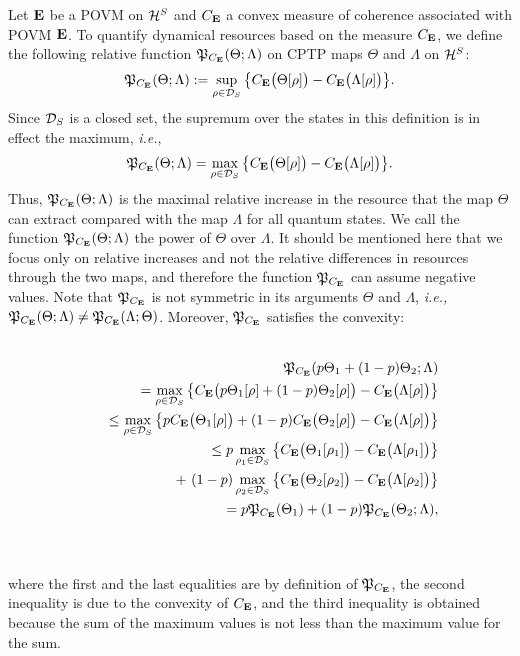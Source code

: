 \documentclass[american,aps,pra,reprint, superscriptaddress]{revtex4-1}
\def\be{\begin{equation}}
\def\ee{\end{equation}}
\def\bea{\begin{eqnarray*}}
\def\eea{\end{eqnarray*}}
\theoremstyle{plain}
\theoremstyle{definition}
\theoremstyle{remark}
\begin{document}
Let $\mathbf{E}$ be a POVM on $\mathcal{H}^{S}$ and $C_{\mathbf{E}}$ a convex measure of coherence associated with POVM $\mathbf{E}$. To quantify dynamical resources based on the measure $C_{\mathbf{E}}$, we define the following relative function $\mathfrak{P}_{C_{\mathbf{E}}}(\Theta;\Lambda)$ on CPTP maps $\Theta$ and $\Lambda$ on $\mathcal{H}^{S}$:
\be\label{eq:5}
\fP_{C_\bE}(\Theta;\Lambda) := \sup_{\rho\in\cD_S}\big\{C_\bE\big(\Theta[\rho]\big)-C_\bE\big(\Lambda[\rho]\big)\big\}.
\ee
Since $\mathcal{D}_S$ is a closed set, the supremum over the states in this definition is in effect the maximum, \emph{i.e.},
\bea
\fP_{C_\bE}(\Theta;\Lambda) = \max_{\rho\in\cD_S}\big\{C_\bE\big(\Theta[\rho]\big)-C_\bE\big(\Lambda[\rho]\big)\big\}.
\eea
Thus, $\mathfrak{P}_{C_{\mathbf{E}}}(\Theta;\Lambda)$ is the maximal relative increase in the resource that the map $\Theta$ can extract compared with the map $\Lambda$ for all quantum states. We call the function $\mathfrak{P}_{C_{\mathbf{E}}}(\Theta;\Lambda)$ the power of $\Theta$ over $\Lambda$. It should be mentioned here that we focus only on relative increases and not the relative differences in resources through the two maps, and therefore the function $\mathfrak{P}_{C_{\mathbf{E}}}$ can assume negative values.
Note that $\mathfrak{P}_{C_{\mathbf{E}}}$ is not symmetric in its arguments $\Theta$ and $\Lambda$, \emph{i.e.,} $\mathfrak{P}_{C_{\mathbf{E}}}(\Theta;\Lambda)\neq \mathfrak{P}_{C_{\mathbf{E}}}(\Lambda;\Theta)$.
Moreover, $\mathfrak{P}_{C_{\mathbf{E}}}$ satisfies the convexity:\\
\\
\parbox{6.2cm}{
\begin{eqnarray*}
&&\fP_{C_\bE}(p\Theta_1+(1-p)\Theta_2;\Lambda)\\
&&\quad =  \max_{\rho\in\cD_S}\big\{C_\bE\big(p\Theta_1[\rho]+(1-p)\Theta_2[\rho]\big)-C_\bE\big(\Lambda[\rho]\big)\big\}\\
&&\quad \leq \max_{\rho\in\cD_S}\big\{pC_\bE\big(\Theta_1[\rho]\big)+(1-p)C_\bE\big(\Theta_2[\rho]\big)-C_\bE\big(\Lambda[\rho]\big)\big\}\\
&&\quad \leq p\max_{\rho_1\in\cD_S}\big\{C_\bE\big(\Theta_1[\rho_1]\big)-C_\bE\big(\Lambda[\rho_1]\big)\big\}\\
&&\qquad +\ (1-p)\max_{\rho_2\in\cD_S}\big\{C_\bE\big(\Theta_2[\rho_2]\big)-C_\bE\big(\Lambda[\rho_2]\big)\big\}\\
&&\quad =p\fP_{C_\bE}(\Theta_1) + (1-p)\fP_{C_\bE}(\Theta_2;\Lambda),
\end{eqnarray*}}\hfill
\parbox{.3cm}{\begin{eqnarray}\label{eq:the convexity of power}\end{eqnarray}}\\
where the first and the last equalities are by definition of $\mathfrak{P}_{C_{\mathbf{E}}}$, the second inequality is due to the convexity of $C_{\mathbf{E}}$, and the third inequality is obtained because the sum of the maximum values is not less than the maximum value for the sum.
\end{document}
